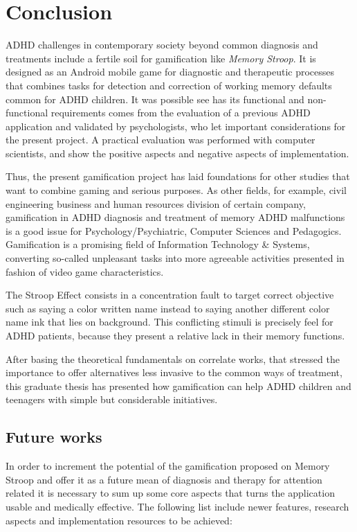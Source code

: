 \chapter{Conclusion}
\label{ch:conclusion}

ADHD challenges in contemporary society beyond common diagnosis and treatments include a fertile soil for gamification like \textit{Memory Stroop}. It is designed as an Android mobile game for diagnostic and therapeutic processes that combines tasks for detection and correction of working memory defaults common for ADHD children. It was possible see has its functional and non-functional requirements comes from the evaluation of a previous ADHD application and validated by psychologists, who let important considerations for the present project. A practical evaluation was performed with computer scientists, and show the positive aspects and negative aspects of implementation.

Thus, the present gamification project has laid foundations for other studies that want to combine gaming and serious purposes.  As other fields, for example, civil engineering business and human resources division of certain company, gamification in ADHD diagnosis and treatment of memory ADHD malfunctions is a good issue for Psychology/Psychiatric, Computer Sciences and Pedagogics. Gamification is a promising field of Information Technology \& Systems, converting so-called unpleasant tasks into more agreeable activities presented in fashion of video game characteristics. 

The Stroop Effect consists in a concentration fault to target correct objective such as saying a color written name instead to saying another different color name ink that lies on background. This conflicting stimuli is precisely feel for ADHD patients, because they present a relative lack in their memory functions.

After basing the theoretical fundamentals on correlate works, that stressed the importance to offer alternatives less invasive to the common ways of treatment, this graduate thesis has presented how gamification can help ADHD children and teenagers with simple but considerable initiatives.

\section{Future works}

In order to increment the potential of the gamification proposed on Memory Stroop and offer it as a future mean of diagnosis and therapy for attention related it is necessary to sum up some core aspects that turns the application usable and medically effective. The following list include newer features, research aspects and implementation resources to be achieved:

